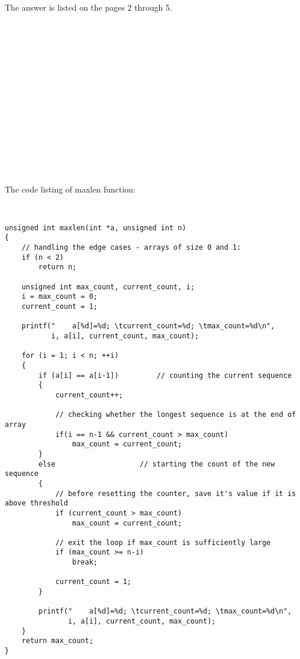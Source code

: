 \documentclass{article}
\begin{document}
		The answer is listed on the pages 2 through 5.

\paragraph{}\
\paragraph{}\
\paragraph{}\
\paragraph{}\
\paragraph{}\
\paragraph{}\
\paragraph{}\



\noindent The code listing of maxlen function:
\ttfamily
	
\begin{verbatim} 


unsigned int maxlen(int *a, unsigned int n)
{
    // handling the edge cases - arrays of size 0 and 1:
    if (n < 2)                                      
        return n;

    unsigned int max_count, current_count, i;
    i = max_count = 0;
    current_count = 1;

    printf("    a[%d]=%d; \tcurrent_count=%d; \tmax_count=%d\n",
           i, a[i], current_count, max_count);

    for (i = 1; i < n; ++i)
    {
        if (a[i] == a[i-1])         // counting the current sequence
        {
            current_count++;

            // checking whether the longest sequence is at the end of array
            if(i == n-1 && current_count > max_count)
                max_count = current_count;
        }
        else            	    // starting the count of the new sequence
        {
            // before resetting the counter, save it's value if it is above threshold
            if (current_count > max_count)
                max_count = current_count;

            // exit the loop if max_count is sufficiently large
            if (max_count >= n-i)
                break;
                
            current_count = 1;
        }

        printf("    a[%d]=%d; \tcurrent_count=%d; \tmax_count=%d\n",
               i, a[i], current_count, max_count);
    }
    return max_count;
}
\end{verbatim}	
	
\end{document}
